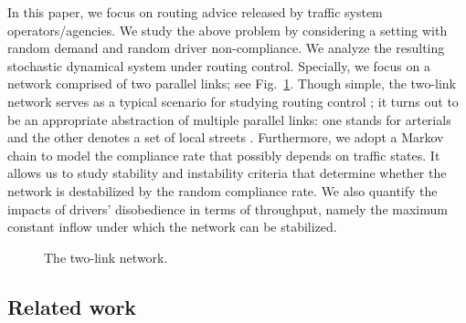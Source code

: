 In this paper, we focus on routing advice released by traffic system operators/agencies. We study the above problem by considering a setting with random demand and random driver non-compliance. We analyze the resulting stochastic dynamical system under  routing control. Specially, we focus on a network comprised of two parallel links; see Fig.~\ref{fig_twolink}. Though simple, the two-link network serves as a typical scenario for studying routing control \cite{ephremides1980simple, zhang2019modeling,xie2020resilience,tang2020security}; it turns out to be an appropriate abstraction of multiple parallel links: one stands for arterials and the other denotes a set of local streets \cite{pi2017stochastic}. Furthermore, we adopt a Markov chain to model the compliance rate that possibly depends on traffic states. It allows us to study stability and instability criteria that determine whether the network is destabilized by the random compliance rate. We also quantify the impacts of drivers' disobedience in terms of throughput, namely the maximum constant inflow under which the network can be stabilized.
\begin{figure}[htbp]
    \centering
    \caption{The two-link network.}
    \label{fig_twolink}
\end{figure}

\subsection{Related work}

